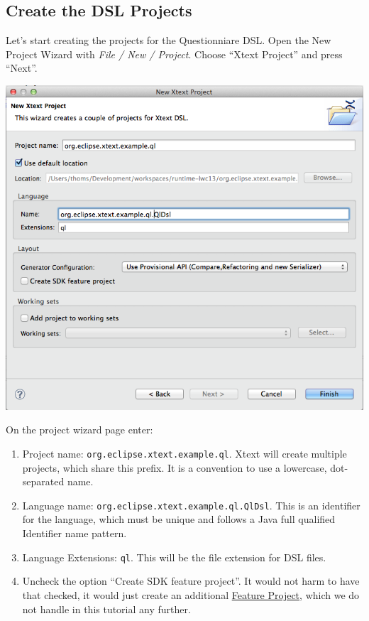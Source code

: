 \subsection{Create the DSL Projects}

Let's start creating the projects for the Questionniare DSL. Open the New
Project Wizard with \emph{File / New / Project}. Choose ``Xtext Project'' and press
``Next''.

\includegraphics[width=17cm]{./images/chapter01/NewXtextProjectWizard.png}

On the project wizard page enter:
\begin{enumerate}
  \item Project name: \texttt{org.eclipse.xtext.example.ql}. Xtext will create
  multiple projects, which share this prefix. It is a convention to use
  a lowercase, dot-separated name.
  \item Language name: \texttt{org.eclipse.xtext.example.ql.QlDsl}. This is an
  identifier for the language, which must be unique and follows a Java
  full qualified Identifier name pattern.
  \item Language Extensions: \texttt{ql}. This will be the file extension for
  DSL files.
  \item Uncheck the option ``Create SDK feature project''. It would not harm to
  have that checked, it would just create an additional
  \href{http://www.vogella.com/articles/EclipseFeatureProject/article.html}{Feature
  Project}, which we do not handle in this tutorial any further.
\end{enumerate}

